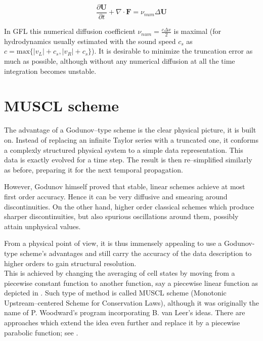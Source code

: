 \begin{equation}
  \frac{\partial\textbf{U}}{\partial t} + \nabla\cdot\textbf{F} = \nu_{num}\Delta\textbf{U}
\end{equation}

In GFL this numerical diffusion coefficient $\nu_{num} = \frac{c\Delta x}{2}$ is maximal (for hydrodynamics usually estimated with the sound speed $c_{s}$ as $c = \mathrm{max}\big\{ \vert v_{L}\vert + c_{s}, \vert v_{R}\vert + c_{s} \big\}$).
It is desirable to minimize the truncation error as much as possible, although without any numerical diffusion at all the time integration becomes unstable.


\section{MUSCL scheme}
\label{sec:MUSCL}

The advantage of a Godunov--type scheme is the clear physical picture, it is built on.
Instead of replacing an infinite Taylor series with a truncated one, it conforms a complexly structured physical system to a simple data representation.
This data is exactly evolved for a time step.
The result is then re--simplified similarly as before, preparing it for the next temporal propagation.

However, Godunov himself proved that stable, linear schemes achieve at most first order accuracy.
Hence it can be very diffusive and smearing around discontinuities.
On the other hand, higher order classical schemes which produce sharper discontinuities, but also spurious oscillations around them, possibly attain unphysical values.

From a physical point of view, it is thus immensely appealing to use a Godunov-type scheme's advantages and still carry the accuracy of the data description to higher orders to gain structural resolution.
\\[6pt]
%
This is achieved by changing the averaging of cell states by moving from a piecewise constant function to another function, say a piecewise linear function as depicted in .
Such type of method is called MUSCL scheme (Monotonic Upstream--centered Scheme for Conservation Laws), although it was originally the name of P. Woodward's program incorporating B. van Leer's ideas.
There are approaches which extend the idea even further and replace it by a piecewise parabolic function; see \citet{PPM_Colella}.

